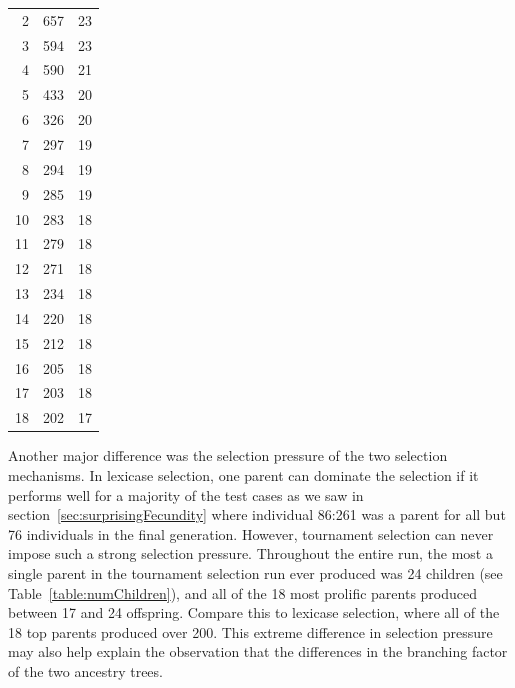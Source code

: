 \begin{table}
{\begin{tabular}{rrr}
			2 & 657 & 23 \\
			3 & 594 & 23 \\
			4 & 590 & 21 \\
			5 & 433 & 20 \\
			6 & 326 & 20 \\
			7 & 297 & 19 \\
			8 & 294 & 19 \\
			9 & 285 & 19 \\
			10 & 283 & 18 \\
			11 & 279 & 18 \\
			12 & 271 & 18 \\
			13 & 234 & 18 \\
			14 & 220 & 18 \\
			15 & 212 & 18 \\
			16 & 205 & 18 \\
			17 & 203 & 18 \\
			18 & 202 & 17 \\
		\end{tabular}
		}%
\end{table}

Another major difference was the selection pressure of the two selection mechanisms. In lexicase 
selection, one parent can dominate the selection if it performs well for a majority of the test 
cases as we saw in section~\ref{sec:surprisingFecundity} where individual 86:261 was a parent for 
all but 76 individuals in the final generation. However, tournament selection can never 
impose such a strong selection pressure. Throughout the entire run,
the most a single parent in the tournament selection run ever produced was 24 children 
(see Table~\ref{table:numChildren}), and all of the 18 most prolific parents produced between 17
and 24 offspring. Compare this to lexicase selection, where all of the 18 top parents produced over 
200. This extreme difference in selection pressure may also help explain the observation that the 
differences in the branching factor of the two ancestry trees.

